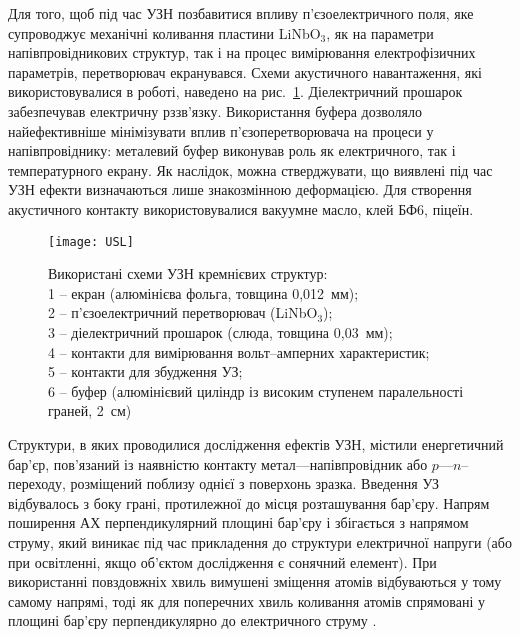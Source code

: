 Для того, щоб під час УЗН позбавитися впливу п'єзоелектричного поля, яке супроводжує механічні коливання пластини LiNbO$_3$,  як на параметри напівпровідникових структур, так і на процес вимірювання електрофізичних параметрів,
перетворювач екранувався.
Схеми акустичного навантаження, які використовувалися в роботі, наведено на рис.~\ref{figUSL}.
Діелектричний прошарок забезпечував електричну рззв'язку.
Використання буфера дозволяло найефективніше мінімізувати вплив п'єзоперетворювача на процеси у напівпровіднику:
металевий буфер виконував роль як електричного, так і температурного екрану.
Як наслідок, можна стверджувати, що виявлені під час УЗН ефекти визначаються лише знакозмінною деформацією.
Для створення акустичного контакту використовувалися вакуумне масло, клей БФ6, піцеїн.

\begin{figure}
\center
\texttt{[image: USL]}%
\caption{\label{figUSL}
Використані схеми УЗН кремнієвих структур: \protect\\
1 --  екран (алюмінієва фольга, товщина 0,012~мм);\protect\\
2 -- п'єзоелектричний перетворювач (LiNbO$_3$);\protect\\
3 -- діелектричний прошарок (слюда, товщина 0,03~мм);\protect\\
4 -- контакти для вимірювання вольт--амперних характеристик;\protect\\
5 -- контакти для збудження УЗ;\protect\\
6 -- буфер (алюмінієвий циліндр із високим ступенем паралельності граней, 2~см)
}
\end{figure}



Структури, в яких проводилися дослідження ефектів УЗН, містили енергетичний бар'єр, пов'язаний із наявністю контакту метал---напівпровідник або $p$---$n$--переходу, розміщений поблизу однієї з поверхонь зразка.
Введення УЗ відбувалось з боку грані, протилежної до місця розташування бар'єру.
 Напрям поширення АХ перпендикулярний площині бар'єру і збігається з напрямом струму, який виникає під час прикладення до структури електричної напруги (або при освітленні, якщо об'єктом дослідження є сонячний елемент).
  При використанні повздовжніх хвиль вимушені зміщення атомів відбуваються у тому самому напрямі, тоді як для поперечних хвиль коливання атомів спрямовані у площині бар'єру перпендикулярно до електричного струму .


